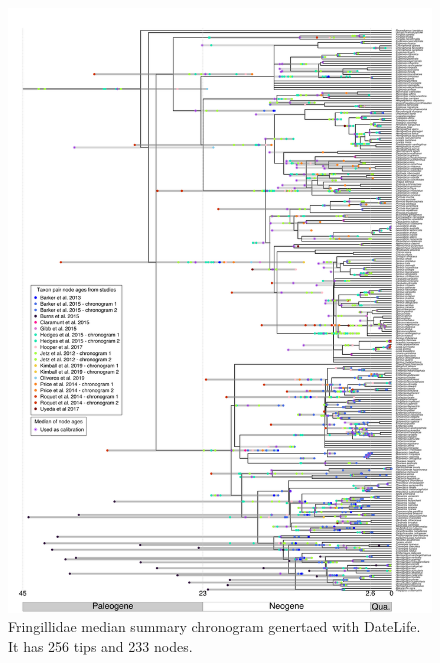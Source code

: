 \documentclass[
  english,
  man]{apa6}
\begin{document}
\begin{figure}[!h]
\includegraphics{../figures/figure-fringillidae/median_and_calibration_ages_simple.png}
\caption{Fringillidae median summary chronogram genertaed with DateLife. It has 256 tips and 233 nodes.}
\label{fig:fringillidages}
\end{figure}



\end{document}
